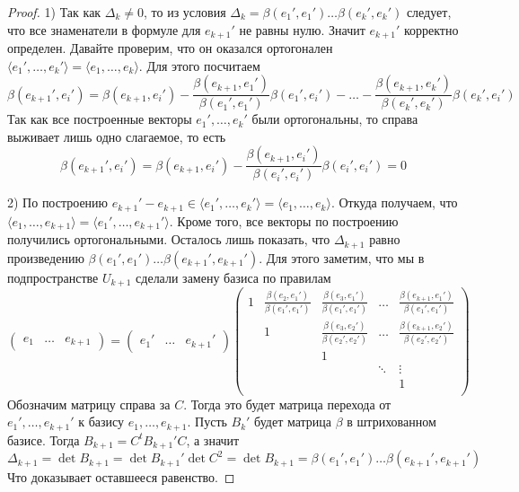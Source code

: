 \begin{proof}
1) Так как $\Delta_k\neq 0$, то из условия $\Delta_k = \beta(e_1',e_1') \ldots \beta(e_k',e_k')$ следует, что все знаменатели в формуле для $e_{k+1}'$ не равны нулю.
Значит $e_{k+1}'$ корректно определен.
Давайте проверим, что он оказался ортогонален $\langle e_1',\ldots,e_k'\rangle = \langle e_1,\ldots,e_k\rangle$.
Для этого посчитаем 
\[
\beta(e_{k+1}', e_i') = \beta(e_{k+1}, e_i') - \frac{\beta(e_{k+1}, e_1')}{\beta(e_1',e_1')}\beta(e_1', e_i') - \ldots - \frac{\beta(e_{k+1}, e_{k}')}{\beta(e_{k}',e_{k}')}\beta(e_{k}', e_i')
\]
Так как все построенные векторы $e_1',\ldots,e_k'$ были ортогональны, то справа выживает лишь одно слагаемое, то есть
\[
\beta(e_{k+1}', e_i') = \beta(e_{k+1}, e_i') - \frac{\beta(e_{k+1}, e_i')}{\beta(e_i',e_i')}\beta(e_i', e_i') = 0
\]

2) По построению $e_{k+1}'-e_{k+1} \in \langle e_1',\ldots,e_k'\rangle = \langle e_1,\ldots,e_k\rangle$.
Откуда получаем, что $\langle e_1,\ldots,e_{k+1}\rangle = \langle e_1',\ldots,e_{k+1}'\rangle$.
Кроме того, все векторы по построению получились ортогональными.
Осталось лишь показать, что $\Delta_{k+1}$ равно произведению $\beta(e_1',e_1')\ldots \beta(e_{k+1}',e_{k+1}')$.
Для этого заметим, что мы в подпространстве $U_{k+1}$ сделали замену базиса по правилам
\[
\begin{pmatrix}
{e_1}&{\ldots}&{e_{k+1}}
\end{pmatrix}
=
\begin{pmatrix}
{e_1'}&{\ldots}&{e_{k+1}'}
\end{pmatrix}
\begin{pmatrix}
{1}&{\frac{\beta(e_2,e_1')}{\beta(e_1',e_1')}}&{\frac{\beta(e_3,e_1')}{\beta(e_1',e_1')}}&{\ldots}&{\frac{\beta(e_{k+1},e_1')}{\beta(e_1',e_1')}}\\
{}&{1}&{\frac{\beta(e_3,e_2')}{\beta(e_2',e_2')}}&{\ldots}&{\frac{\beta(e_{k+1},e_2')}{\beta(e_2',e_2')}}\\
{}&{}&{1}&{}&{}\\
{}&{}&{}&{\ddots}&{\vdots}\\
{}&{}&{}&{}&{1}\\
\end{pmatrix}
\]
Обозначим матрицу справа за $C$.
Тогда это будет матрица перехода от $e_1',\ldots,e_{k+1}'$ к базису $e_1,\ldots,e_{k+1}$.
Пусть $B_k'$ будет матрица $\beta$ в штрихованном базисе.
Тогда $B_{k+1} = C^t B_{k+1}' C$, а значит 
\[
\Delta_{k+1} = \det B_{k+1}  = \det B_{k+1}' \det C^2 = \det B_{k+1} = \beta(e_1',e_1')\ldots \beta(e_{k+1}',e_{k+1}')
\]
Что доказывает оставшееся равенство.
\end{proof}

